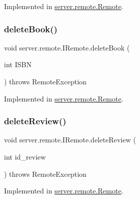 Implemented in \hyperlink{classserver_1_1remote_1_1_remote_af5d1abb1730b8db14ab9dd476df158d8}{server.\+remote.\+Remote}.

\mbox{\label{interfaceserver_1_1remote_1_1_i_remote_ac64967dff86a9c603d0c9eb815f222df}} 
\subsubsection{\texorpdfstring{delete\+Book()}{deleteBook()}}
{\footnotesize\ttfamily void server.\+remote.\+I\+Remote.\+delete\+Book (\begin{DoxyParamCaption}\item[{int}]{I\+S\+BN }\end{DoxyParamCaption}) throws Remote\+Exception}



Implemented in \hyperlink{classserver_1_1remote_1_1_remote_a013ab36d40de824c6ad7a48f59d12684}{server.\+remote.\+Remote}.

\mbox{\label{interfaceserver_1_1remote_1_1_i_remote_a2bcc3db515d7b6f420449bcf6367298c}} 
\subsubsection{\texorpdfstring{delete\+Review()}{deleteReview()}}
{\footnotesize\ttfamily void server.\+remote.\+I\+Remote.\+delete\+Review (\begin{DoxyParamCaption}\item[{int}]{id\+\_\+review }\end{DoxyParamCaption}) throws Remote\+Exception}



Implemented in \hyperlink{classserver_1_1remote_1_1_remote_ab80b5addc446fe5f1ecf9a522794ff4f}{server.\+remote.\+Remote}.

\mbox{\label{interfaceserver_1_1remote_1_1_i_remote_a017e07cb93ae582188c20d7b1ce6b014}} 
